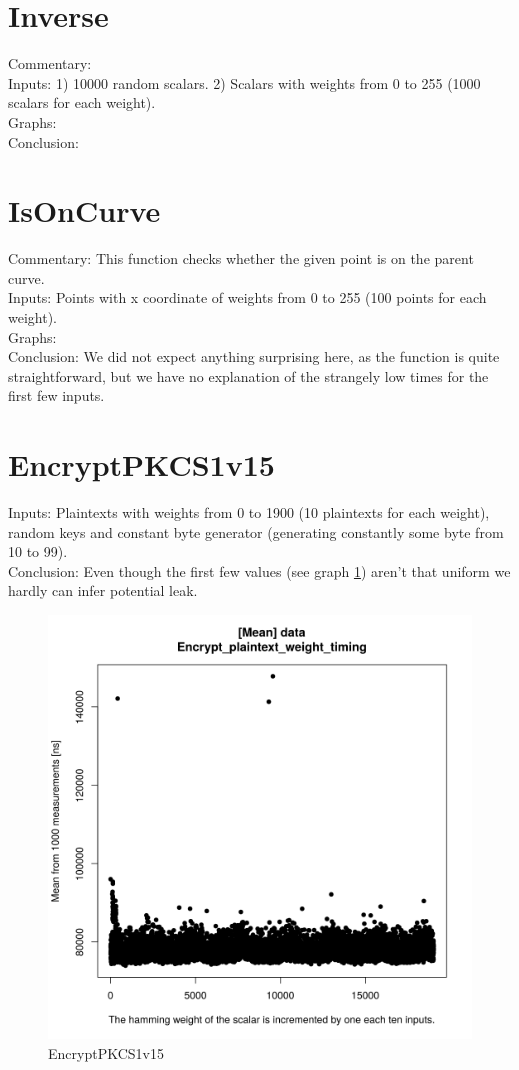 \documentclass[a4paper]{scrartcl}
\begin{document}
\section{Inverse}
Commentary:
\\Inputs: 1) 10000 random scalars. 2) Scalars with weights from 0 to 255 (1000 scalars for each weight).
\\Graphs:
\\Conclusion:

\section{IsOnCurve}
Commentary: This function checks whether the given point is on the parent curve.
\\Inputs: Points with x coordinate of weights from 0 to 255 (100 points for each weight).
\\Graphs:
\\Conclusion: We did not expect anything surprising here, as the function is quite straightforward, but we have no explanation of the strangely low times for the first few inputs.
\fi

\section{EncryptPKCS1v15}
Inputs: Plaintexts with weights from 0 to 1900 (10 plaintexts for each weight), random keys and constant byte generator (generating constantly some byte from 10 to 99).
\\Conclusion: Even though the first few values (see graph \ref{fig:EncryptPKCS1v15}) aren't that uniform we hardly can infer potential leak.

\begin{figure}
    \centering
  \includegraphics[width=0.4\linewidth]{data_Encrypt_plaintext_weight_timing-means.png}
  \caption{EncryptPKCS1v15}
  \label{fig:EncryptPKCS1v15}
\end{figure}
\end{document}
